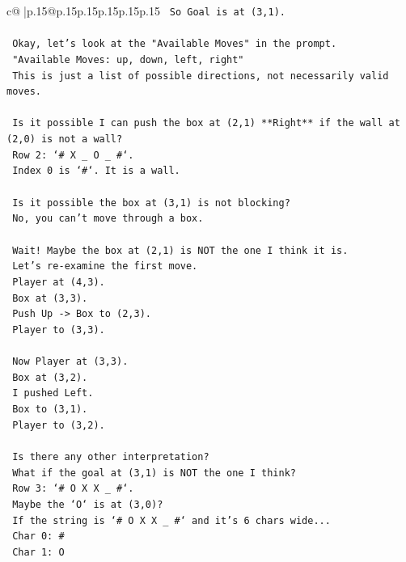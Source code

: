 \documentclass{article}
\begin{document}
{\begin{supertabular}{c@{$\;$}|p{.15\linewidth}@{}p{.15\linewidth}p{.15\linewidth}p{.15\linewidth}p{.15\linewidth}p{.15\linewidth}}
{{{\texttt{    So Goal is at (3,1).} \\
\\ 
\texttt{    Okay, let's look at the "Available Moves" in the prompt.} \\
\texttt{    "Available Moves: up, down, left, right"} \\
\texttt{    This is just a list of possible directions, not necessarily valid moves.} \\
\\ 
\texttt{    Is it possible I can push the box at (2,1) **Right** if the wall at (2,0) is not a wall?} \\
\texttt{    Row 2: `\# X \_ O \_ \#`.} \\
\texttt{    Index 0 is `\#`. It is a wall.} \\
\\ 
\texttt{    Is it possible the box at (3,1) is not blocking?} \\
\texttt{    No, you can't move through a box.} \\
\\ 
\texttt{    Wait! Maybe the box at (2,1) is NOT the one I think it is.} \\
\texttt{    Let's re{-}examine the first move.} \\
\texttt{    Player at (4,3).} \\
\texttt{    Box at (3,3).} \\
\texttt{    Push Up {-}> Box to (2,3).} \\
\texttt{    Player to (3,3).} \\
\\ 
\texttt{    Now Player at (3,3).} \\
\texttt{    Box at (3,2).} \\
\texttt{    I pushed Left.} \\
\texttt{    Box to (3,1).} \\
\texttt{    Player to (3,2).} \\
\\ 
\texttt{    Is there any other interpretation?} \\
\texttt{    What if the goal at (3,1) is NOT the one I think?} \\
\texttt{    Row 3: `\# O X X \_ \#`.} \\
\texttt{    Maybe the `O` is at (3,0)?} \\
\texttt{    If the string is `\# O X X \_ \#` and it's 6 chars wide...} \\
\texttt{    Char 0: \#} \\
\texttt{    Char 1: O} \\
}}}
\end{supertabular}}
\end{document}
